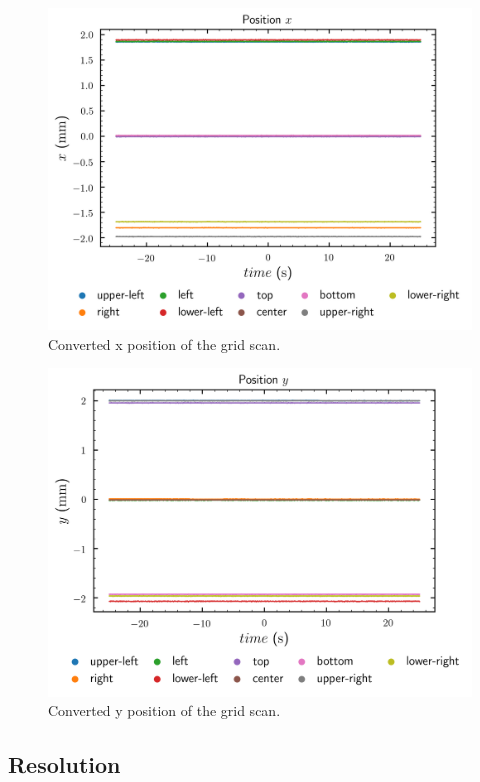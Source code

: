 \begin{figure}[htb]
	\centering
	\includegraphics{figure/plot/x}
	\caption{Converted x position of the grid scan.}\label{fig:grid_scan_x}
\end{figure}
\begin{figure}[htb]
	\centering
	\includegraphics{figure/plot/y}
	\caption{Converted y position of the grid scan.}\label{fig:grid_scan_y}
\end{figure}


\subsection{Resolution}

